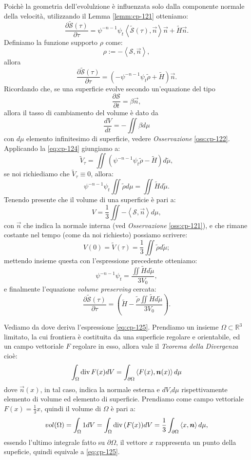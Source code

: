 Poichè la geometria dell'evolulzione è influenzata solo dalla componente normale della velocità, utilizzando il Lemma \ref{lemm:cp-121} otteniamo:
\[
\frac{\partial\mathcal{\tilde{S}}(\tau)}{\partial\tau}=\psi^{-n-1}\psi_t\left<\mathcal{\tilde{S}}(\tau),\vec{n}\right>\vec{n}+\tilde{H}\vec{n}.
\]
Definiamo la funzione supporto $\rho$ come:
\[
\rho:=-\left<\mathcal{S},\vec{n}\right>,
\]
allora
\[
\frac{\partial\mathcal{\tilde{S}}(\tau)}{\partial\tau}=\left(-\psi^{-n-1}\psi_t\tilde{\rho}+\tilde{H}\right)\vec{n}.
\]
Ricordando che, se una superficie evolve secondo un'equazione del tipo
\[
\frac{\partial \mathcal{S}}{\partial t}=\beta\vec{n},
\]
allora il tasso di cambiamento del volume è dato da
\begin{equation}
\label{eq:cp-124}
\frac{d V}{d t}=-\iint\beta d\mu
\end{equation}
con $d\mu$ elemento infinitesimo di superficie, vedere \emph{Osservazione} \ref{oss:cp-122}.
 Applicando la \eqref{eq:cp-124} giungiamo a:
\[
\tilde{V}_{\tau}=\iint(\psi^{-n-1}\psi_t\tilde{\rho}-\tilde{H})d\tilde{\mu},
\]
se noi richiediamo che $\tilde{V}_{\tau}\equiv 0$, allora:
\[
\psi^{-n-1}\psi_t\iint\tilde{\rho}d\mu = \iint\tilde{H}d\tilde{\mu}.
\]
 Tenendo presente che il volume di una superficie è pari a:
\begin{equation}
  \label{eq:cp-125}
V=\frac{1}{3}\iint-\left<\mathcal{S},\vec{n}\right>d\mu,
\end{equation}
con $\vec{n}$ che indica la normale interna (ved \emph{Osservazione} \ref{oss:cp-121}), e che rimane costante nel tempo (come da noi richiesto) possiamo scrivere:
\[
V(0)=\tilde{V}(\tau)=\frac{1}{3}\iint\tilde{\rho}d\tilde{\mu};
\]
mettendo insieme questa con l'espressione precedente otteniamo:
\[
\psi^{-n-1}\psi_t=\frac{\iint\tilde{H}d\tilde{\mu}}{3V_0},
\]
e finalmente l'equazione \emph{volume preserving} cercata:
\begin{equation}
\label{eq:cp-126}
\frac{\partial\mathcal{\tilde{S}}(\tau)}{\partial\tau}=\left(\tilde{H}-\frac{\tilde{\rho}\iint\tilde{H}d\tilde{\mu}}{3V_0}\right).
\end{equation}
\begin{osservazione}
\label{oss:cp-121}
Vediamo da dove deriva l'espressione \eqref{eq:cp-125}. Prendiamo un insieme $\Omega\subset\mathbb{R}^3$ limitato, la cui frontiera è costituita da una superficie regolare e orientabile, ed un campo vettoriale $F$ regolare in esso, allora vale il \emph{Teorema della Divergenza} cioè:
\[
\int_{\Omega}\operatorname{div}{F(x)}dV =\int_{\partial\Omega}\left<F(x),\bm{n}(x)\right>d\mu
\]
dove $\vec{n}(x)$, in tal caso, indica la normale esterna e $dV$,$d\mu$ rispettivamente elemento di volume ed elemento di superficie. Prendiamo come campo vettoriale $F(x)=\frac{1}{3}x$, quindi il volume di $\Omega$ è pari a:
\[
vol(\Omega)=\int_{\Omega}1dV=\int_{\Omega}\operatorname{div}{(F(x))}dV=\frac{1}{3}\int_{\partial\Omega}\left<x,\bm{n}\right>d\mu,
\]
essendo l'ultimo integrale fatto su $\partial\Omega$, il vettore $x$ rappresenta un punto della supeficie, quindi equivale a \eqref{eq:cp-125}.
\end{osservazione}

